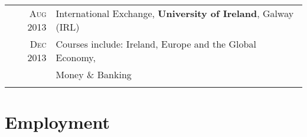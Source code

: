 \documentclass[a4paper,10pt]{article} %
\begin{document}
\begin{tabular}{rl}

\textsc{Aug 2013} & International Exchange, \textbf{University of Ireland}, Galway (IRL)\\
\textsc{Dec 2013} & \footnotesize{Courses include: Ireland, Europe and the Global Economy,}\\
& \footnotesize{Money \& Banking} \\
&\\

\end{tabular}


\section{Employment}
\end{document}

